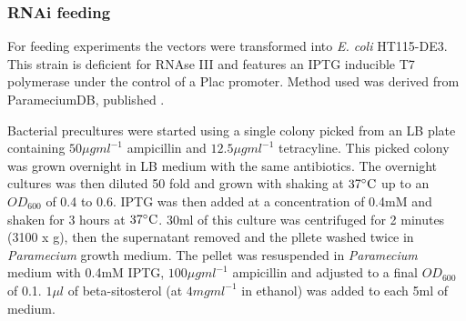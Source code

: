 \begin{table}
    \centering
    \caption[Table of RNAi vectors and inserts used]{Details of RNAi vectors used.  All constructs were cloned into a L4440 vector and used an Ampicillin resistance markers.}
    \label{tab:rnai_vecs}
\end{table}

\subsubsection{RNAi feeding}

For feeding experiments the vectors were transformed into \textit{E. coli} HT115-DE3.
This strain is deficient for RNAse III and features an IPTG inducible T7 polymerase
under the control of a Plac promoter. Method used was derived from ParameciumDB, 
published \citep{Beisson2010}.

Bacterial precultures were started using a single colony picked from an LB
plate containing \(50\mu gml^{-1}\) ampicillin and \(12.5\mu g ml^{-1}\) tetracyline.
This picked colony was grown overnight in LB medium with the same antibiotics.
The overnight cultures was then diluted 50 fold and grown with shaking
at \(37\celsius\) up to an \(OD_{600}\) of 0.4 to 0.6. IPTG
was then added at a concentration of 0.4mM and shaken for 3 hours
at \(37\celsius\).  30ml of this culture was centrifuged for 2 minutes (3100 x g),
then the supernatant removed and the pllete washed twice in \textit{Paramecium}
growth medium. The pellet was resuspended in \textit{Paramecium} medium with 0.4mM IPTG,
\(100\mu g ml^{-1}\) ampicillin and adjusted to a final \(OD_{600}\) of 0.1.
\(1 \mu l\) of beta-sitosterol (at \(4mg ml^{-1}\) in ethanol) was added
to each 5ml of medium.

